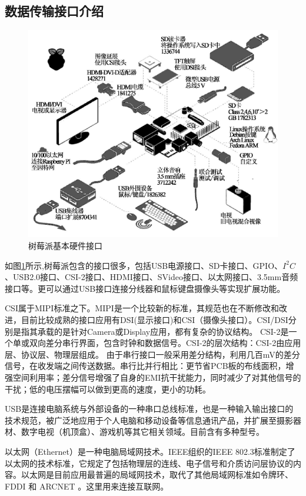 \subsection{数据传输接口介绍}

\begin{figure}[h]
	\centering
	\includegraphics[width=0.7\linewidth]{Figure/rasp_3}
	\caption{树莓派基本硬件接口}
	\label{fig:rasp_1}
\end{figure}

如图\ref{fig:rasp_1}所示,树莓派包含的接口很多，包括USB电源接口、SD卡接口、GPIO、$I^{2}C$、USB2.0接口、CSI-2接口、HDMI接口、SVideo接口、以太网接口、3.5mm音频接口等。更可以通过USB接口连接分线器和鼠标键盘摄像头等实现扩展功能\cite{IoT}。

CSI属于MIPI标准之下。MIPI是一个比较新的标准，其规范也在不断修改和改进，目前比较成熟的接口应用有DSI(显示接口)和CSI（摄像头接口）。CSI/DSI分别是指其承载的是针对Camera或Display应用，都有复杂的协议结构。
CSI-2是一个单或双向差分串行界面，包含时钟和数据信号。CSI-2的层次结构：CSI-2由应用层、协议层、物理层组成。
由于串行接口一般采用差分结构，利用几百mV的差分信号，在收发端之间传送数据。串行比并行相比：更节省PCB板的布线面积，增强空间利用率；差分信号增强了自身的EMI抗干扰能力，同时减少了对其他信号的干扰；低的电压摆幅可以做到更高的速度，更小的功耗。

USB是连接电脑系统与外部设备的一种串口总线标准，也是一种输入输出接口的技术规范，被广泛地应用于个人电脑和移动设备等信息通讯产品，并扩展至摄影器材、数字电视（机顶盒）、游戏机等其它相关领域。目前含有多种型号。

以太网（Ethernet）是一种电脑局域网技术。IEEE组织的IEEE 802.3标准制定了以太网的技术标准，它规定了包括物理层的连线、电子信号和介质访问层协议的内容。以太网是目前应用最普遍的局域网技术，取代了其他局域网标准如令牌环、 FDDI 和 ARCNET 。这里用来连接互联网。


